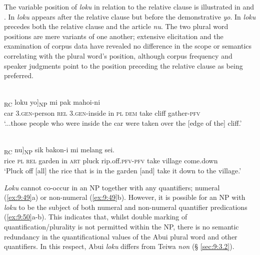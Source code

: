 The variable position of \textit{loku} in relation to the relative clause is illustrated in  and . In  \textit{loku} appears after the relative clause but before the demonstrative \textit{yo}. In  \textit{loku} precedes both the relative clause and the article \textit{nu}. The two plural word positions are mere variants of one another; extensive elicitation and the examination of corpus data have revealed no difference in the scope or semantics correlating with the plural word's position, although corpus frequency and speaker judgments point to the position preceding the relative clause as being preferred.


\ea%
\label{ex:9:47}
 \\
\gll  [...oto he-amakaang [{ba} h-omi {mia}]\textsubscript{RC} loku yo]\textsubscript{NP}  mi pak mahoi-ni \\
  car \textsc{3.gen}-person \textsc{rel} \textsc{3.gen}-inside in \textsc{pl} \textsc{dem}   take cliff gather-\textsc{pfv}  \\
\glt `...those people who were inside the car were taken over the [edge of the] cliff.'
\z
 

\ea%
\label{ex:9:48}
 \\
\gll  [{Sieng} loku [{ba} uti {mia}]\textsubscript{RC} {nu}]\textsubscript{NP} sik bakon-i   mi melang sei. \\
   rice \textsc{pl} \textsc{rel} garden in \textsc{art} pluck rip.off.\textsc{pfv-pfv}   take village come.down \\
\glt `Pluck off [all] the rice that is in the garden [and] take it down to the village.'
\z

 




\textit{Loku} cannot co-occur in an NP together with any quantifiers; numeral (\ref{ex:9:49}a) or non-numeral (\ref{ex:9:49}b). However, it is possible for an NP with \textit{loku} to be the subject of both numeral and non-numeral quantifier predications (\ref{ex:9:50}a-b). This indicates that, whilst double marking of quantification/plurality is not permitted within the NP, there is no semantic redundancy in the quantificational values of the Abui plural word and other quantifiers. In this respect, Abui \textit{loku} differs from Teiwa \textit{non} ({\S} \ref{sec:9:3.2}).


